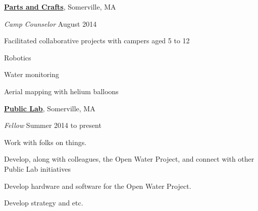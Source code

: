 \documentclass[10pt]{article}
\newcommand{\blankline}{\quad\pagebreak[3]}
\newcommand{\halfblankline}{\quad\vspace{-0.5\baselineskip}\pagebreak[3]}
\begin{document}
\href{http://partsandcrafts.org}{\textbf{Parts and Crafts}},
Somerville, MA
\begin{outerlist}

    \item[] \textit{Camp Counselor}%
            \hfill August 2014
           
 Facilitated collaborative projects with campers aged 5 to 12

 \begin{innerlist}
                \item Robotics

                \item Water monitoring

 \item Aerial mapping with helium balloons

\end{innerlist}

\end{outerlist}

\blankline

\href{http://www.asu.edu/}{\textbf{Public Lab}},
Somerville, MA
\begin{outerlist}

    \item[] \textit{Fellow}%
            \hfill Summer 2014 to present


            \begin{innerlist}
                \item Work with folks on things.

                \item Develop, along with colleagues, the Open Water Project, and connect with other Public Lab initiatives

                \item Develop hardware and software for the Open Water Project.

                \item Develop strategy and etc.
            \end{innerlist}

\end{outerlist}

\halfblankline
\end{document}
